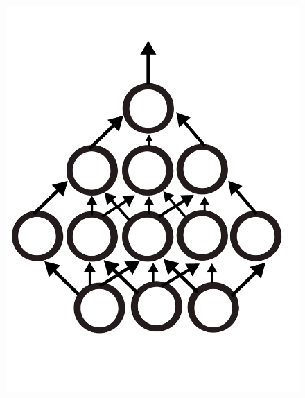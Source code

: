 \begin{figure}[!htb]
  \includegraphics[width=\linewidth]{./Images/Chapter05/mlp.pdf}
\endminipage\hfill
{}

\end{figure}
